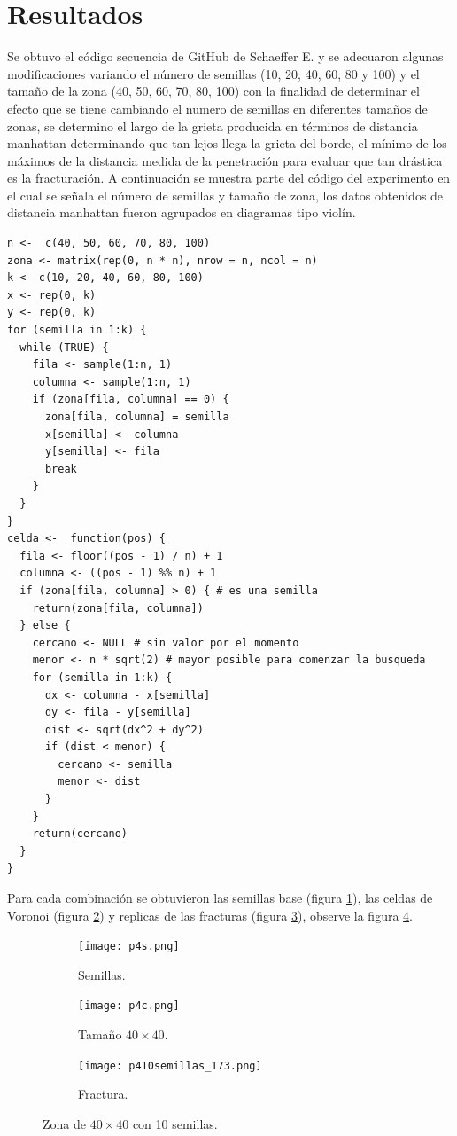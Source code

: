 \documentclass[a4paper]{article}
\begin{document}
\section{Resultados}
\justify
Se obtuvo el código secuencia de GitHub de Schaeffer E. \cite{p3gitdr} y se adecuaron algunas modificaciones variando el número de semillas (10, 20, 40, 60, 80 y 100) y el tamaño de la zona (40, 50, 60, 70, 80, 100) con la finalidad de determinar el efecto que se tiene cambiando el numero de semillas en diferentes tamaños de zonas, se determino el largo de la grieta producida en términos de distancia manhattan determinando que tan lejos llega la grieta del borde, el mínimo de los máximos de la distancia medida de la penetración para evaluar que tan drástica es la fracturación. A continuación se muestra parte del código del experimento \cite{gitadrian} en el cual se señala el número de semillas y tamaño de zona, los datos obtenidos de distancia manhattan fueron agrupados en diagramas tipo violín.
\medskip
\begin{lstlisting}
n <-  c(40, 50, 60, 70, 80, 100)
zona <- matrix(rep(0, n * n), nrow = n, ncol = n)
k <- c(10, 20, 40, 60, 80, 100)
x <- rep(0, k)
y <- rep(0, k) 
for (semilla in 1:k) {
  while (TRUE) { 
    fila <- sample(1:n, 1)
    columna <- sample(1:n, 1)
    if (zona[fila, columna] == 0) {
      zona[fila, columna] = semilla
      x[semilla] <- columna
      y[semilla] <- fila
      break
    }
  }
}
celda <-  function(pos) {
  fila <- floor((pos - 1) / n) + 1
  columna <- ((pos - 1) %% n) + 1
  if (zona[fila, columna] > 0) { # es una semilla
    return(zona[fila, columna])
  } else {
    cercano <- NULL # sin valor por el momento
    menor <- n * sqrt(2) # mayor posible para comenzar la busqueda
    for (semilla in 1:k) {
      dx <- columna - x[semilla]
      dy <- fila - y[semilla]
      dist <- sqrt(dx^2 + dy^2)
      if (dist < menor) {
        cercano <- semilla
        menor <- dist
      }
    }
    return(cercano)
  }
}
\end{lstlisting}
\justify Para cada combinación se obtuvieron las semillas base (figura \ref{b50}), las celdas de Voronoi (figura \ref{b75}) y replicas de las fracturas (figura \ref{b100}), observe la figura \ref{fig:1}.
\medskip
\begin{figure}[h!]
    \centering
\begin{subfigure}[b]{0.3\linewidth}
\texttt{[image: p4s.png]}
\caption{Semillas.}
\label{b50}
\end{subfigure}
\begin{subfigure}[b]{0.3\linewidth}
\texttt{[image: p4c.png]}
\caption{Tamaño $40\times 40$.}
\label{b75}
\end{subfigure}
\begin{subfigure}[b]{0.3\linewidth}
\texttt{[image: p410semillas\_173.png]}
\caption{Fractura.}
\label{b100}
\end{subfigure}
    \caption{Zona de $40\times 40$ con 10 semillas.}
    \label{fig:1}
\end{figure}
\end{document}
